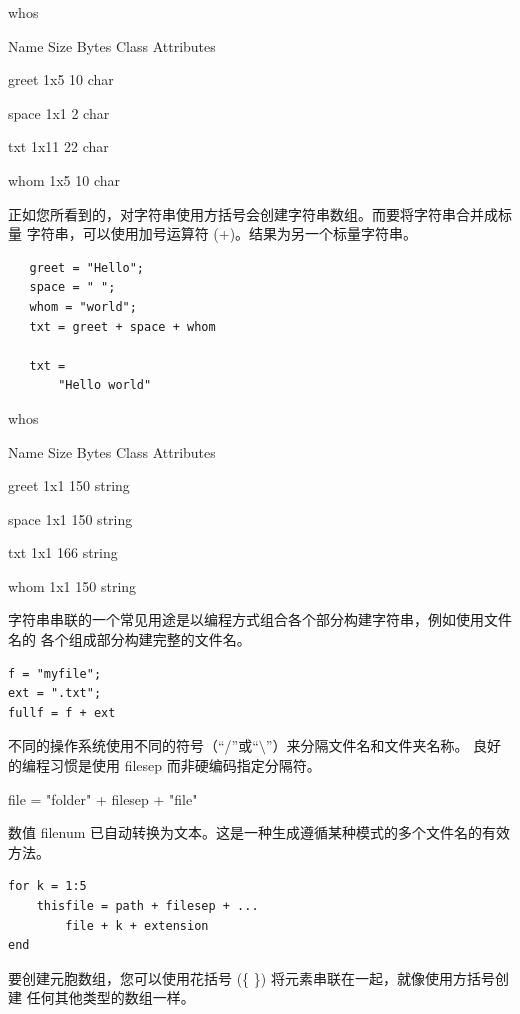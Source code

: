 \documentclass[12pt,a4paper]{article}
\begin{document}
   whos

     Name       Size            Bytes  Class    Attributes
        
     \medskip
     greet      1x5                10  char              

     space      1x1                 2  char           

     txt        1x11               22  char           

     whom       1x5                10  char       

正如您所看到的，对字符串使用方括号会创建字符串数组。而要将字符串合并成标量
字符串，可以使用加号运算符 (+)。结果为另一个标量字符串。


\begin{lstlisting}
   greet = "Hello";
   space = " ";
   whom = "world";
   txt = greet + space + whom
   
   txt = 
       "Hello world"
\end{lstlisting}

   whos

     Name       Size            Bytes  Class     Attributes

     \medskip
     greet      1x1               150  string     

     space      1x1               150  string    

     txt        1x1               166  string    

     whom       1x1               150  string              


字符串串联的一个常见用途是以编程方式组合各个部分构建字符串，例如使用文件名的
各个组成部分构建完整的文件名。

\begin{lstlisting}
f = "myfile";
ext = ".txt";
fullf = f + ext
\end{lstlisting}

不同的操作系统使用不同的符号（“/”或“$\setminus $”）来分隔文件名和文件夹名称。
良好的编程习惯是使用 filesep 而非硬编码指定分隔符。

file = "folder" + filesep + "file"

数值 filenum 已自动转换为文本。这是一种生成遵循某种模式的多个文件名的有效方法。

\begin{lstlisting}
for k = 1:5
    thisfile = path + filesep + ...
        file + k + extension
end
\end{lstlisting}

要创建元胞数组，您可以使用花括号 (\{ \}) 将元素串联在一起，就像使用方括号创建
任何其他类型的数组一样。
\end{document}
